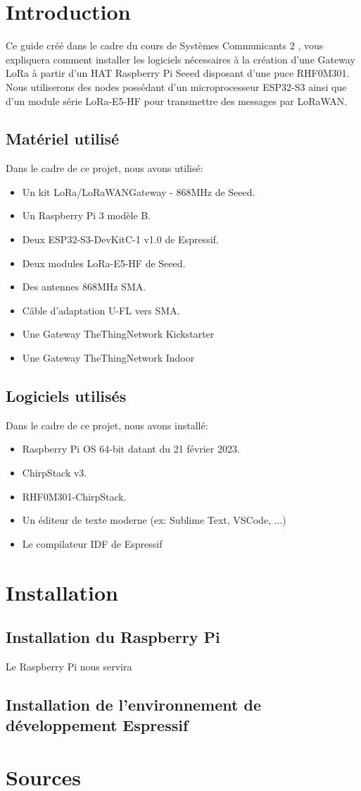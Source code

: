 \documentclass{article}
\begin{document}
	\maketitle
	\newpage
	\tableofcontents
	\newpage
	\section{Introduction}
		Ce guide créé dans le cadre du cours de Systèmes Communicants 2 \textsuperscript\textcopyright, vous expliquera comment installer les logiciels nécessaires à la création d'une Gateway LoRa à partir d'un HAT Raspberry Pi Seeed disposant d'une puce RHF0M301.\\
		Nous utiliserons des nodes possédant d'un microprocesseur ESP32-S3 ainsi que d'un module série LoRa-E5-HF pour transmettre des messages par LoRaWAN\textsuperscript\textregistered.
		\subsection{Matériel utilisé}
			Dans le cadre de ce projet, nous avons utilisé:
			\begin{itemize}
				\item Un kit LoRa/LoRaWAN\textsuperscript\textregistered Gateway - 868MHz de Seeed.
				\item Un Raspberry Pi 3 modèle B.
				\item Deux ESP32-S3-DevKitC-1 v1.0 de Espressif.
				\item Deux modules LoRa-E5-HF de Seeed.
				\item Des antennes 868MHz SMA.
				\item Câble d'adaptation U-FL vers SMA.
				\item Une Gateway TheThingNetwork Kickstarter
				\item Une Gateway TheThingNetwork Indoor 
			\end{itemize}
		\subsection{Logiciels utilisés}
			Dans le cadre de ce projet, nous avons installé:
				\begin{itemize}
				\item Raspberry Pi OS 64-bit datant du 21 février 2023.
				\item ChirpStack v3.
				\item RHF0M301-ChirpStack.
				\item Un éditeur de texte moderne (ex: Sublime Text, VSCode, ...)
				\item Le compilateur IDF de Espressif
			\end{itemize}
	\newpage
	\section{Installation}
		\subsection{Installation du Raspberry Pi}
			Le Raspberry Pi nous servira 
		\subsection{Installation de l'environnement de développement Espressif}
			
	\newpage
	\section{Sources}
		\printbibliography
\end{document}
